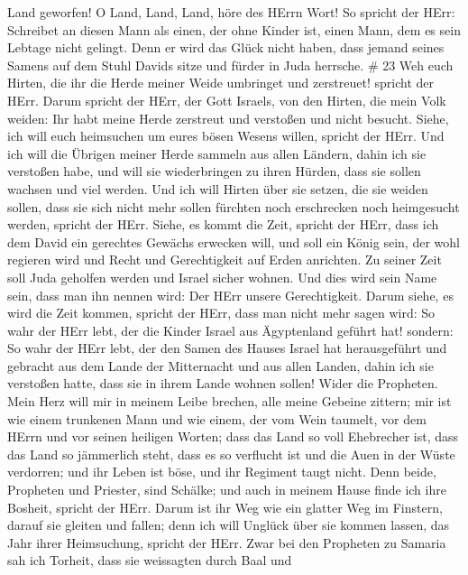 Land geworfen!  O Land, Land, Land, höre des HErrn Wort!
 So spricht der HErr: Schreibet an diesen Mann als einen,
der ohne Kinder ist, einen Mann, dem es sein Lebtage nicht gelingt. Denn
er wird das Glück nicht haben, dass jemand seines Samens auf dem Stuhl
Davids sitze und fürder in Juda herrsche. \# 23  Weh euch
Hirten, die ihr die Herde meiner Weide umbringet und zerstreuet! spricht
der HErr.  Darum spricht der HErr, der Gott Israels, von den
Hirten, die mein Volk weiden: Ihr habt meine Herde zerstreut und
verstoßen und nicht besucht. Siehe, ich will euch heimsuchen um eures
bösen Wesens willen, spricht der HErr.  Und ich will die
Übrigen meiner Herde sammeln aus allen Ländern, dahin ich sie verstoßen
habe, und will sie wiederbringen zu ihren Hürden, dass sie sollen
wachsen und viel werden.  Und ich will Hirten über sie
setzen, die sie weiden sollen, dass sie sich nicht mehr sollen fürchten
noch erschrecken noch heimgesucht werden, spricht der HErr. 
Siehe, es kommt die Zeit, spricht der HErr, dass ich dem David ein
gerechtes Gewächs erwecken will, und soll ein König sein, der wohl
regieren wird und Recht und Gerechtigkeit auf Erden anrichten.
 Zu seiner Zeit soll Juda geholfen werden und Israel sicher
wohnen. Und dies wird sein Name sein, dass man ihn nennen wird: Der HErr
unsere Gerechtigkeit.  Darum siehe, es wird die Zeit kommen,
spricht der HErr, dass man nicht mehr sagen wird: So wahr der HErr lebt,
der die Kinder Israel aus Ägyptenland geführt hat!  sondern:
So wahr der HErr lebt, der den Samen des Hauses Israel hat herausgeführt
und gebracht aus dem Lande der Mitternacht und aus allen Landen, dahin
ich sie verstoßen hatte, dass sie in ihrem Lande wohnen sollen!
 Wider die Propheten. Mein Herz will mir in meinem Leibe
brechen, alle meine Gebeine zittern; mir ist wie einem trunkenen Mann
und wie einem, der vom Wein taumelt, vor dem HErrn und vor seinen
heiligen Worten;  dass das Land so voll Ehebrecher ist,
dass das Land so jämmerlich steht, dass es so verflucht ist und die Auen
in der Wüste verdorren; und ihr Leben ist böse, und ihr Regiment taugt
nicht.  Denn beide, Propheten und Priester, sind Schälke;
und auch in meinem Hause finde ich ihre Bosheit, spricht der HErr.
 Darum ist ihr Weg wie ein glatter Weg im Finstern, darauf
sie gleiten und fallen; denn ich will Unglück über sie kommen lassen,
das Jahr ihrer Heimsuchung, spricht der HErr.  Zwar bei den
Propheten zu Samaria sah ich Torheit, dass sie weissagten durch Baal und
